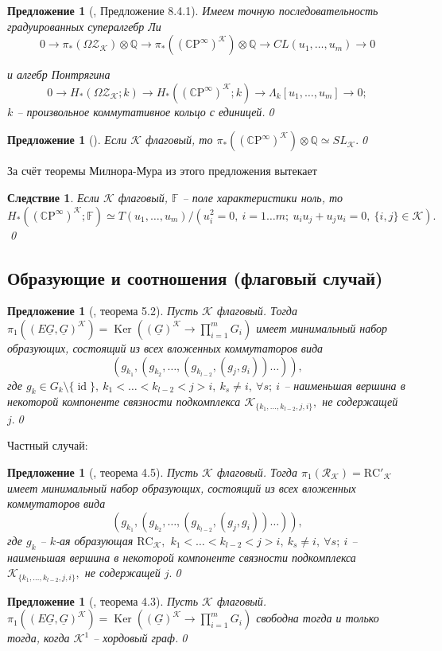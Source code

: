 \documentclass[10pt,a4paper]{article}
\DeclareMathOperator{\id}{id}
\DeclareMathOperator{\Ker}{Ker}
\def\CC{\mathbb{C}}
\def\FF{\mathbb{F}}
\def\QQ{\mathbb{Q}}
\def\RC{\mathrm{RC}}
\def\R{\mathcal{R}}
\def\Z{\mathcal{Z}}
\def\K{\mathcal{K}}
\def\ZK{\Z_\K}
\def\RK{\R_\K}
\def\RCK{\RC_\K}
\def\OZK{\Omega\ZK}
\def\DJ{\CC\mathrm{P}^\infty}
\def\DJK{(\DJ)^\K}
\newtheorem{prp}[thm]{Предложение}
\newtheorem{crl}[thm]{Следствие}
\theoremstyle{definition}
\begin{document}
\begin{prp}[\cite{ToricTopology}, Предложение 8.4.1]
Имеем точную последовательность градуированных супералгебр Ли
$$0\to\pi_*(\OZK)\otimes\QQ\to\pi_*(\DJK)\otimes \QQ\to CL(u_1,\dots,u_m)\to 0$$

и алгебр Понтрягина
$$0\to H_*(\OZK;k)\to H_*(\DJK;k)\to \Lambda_k[u_1,\dots,u_m]\to 0;$$
$k$ -- произвольное коммутативное кольцо с единицей.\qed\end{prp}

\begin{prp}[\cite{pr}] Если $\K$ флаговый, то $\pi_*(\DJK)\otimes\QQ\simeq SL_\K.$\qed
\end{prp}
За счёт теоремы Милнора-Мура из этого предложения вытекает
\begin{crl} Если $\K$ флаговый, $\FF$ -- поле характеристики ноль, то
$$H_*(\DJK;\FF)\simeq T(u_1,\dots, u_m)/\left(u_i^2=0,~i=1\dots m;~u_iu_j+u_ju_i=0,~\{i,j\}\in\K\right).$$\qed
\end{crl}
\subsection{Образующие и соотношения (флаговый случай)}

\begin{prp}[\cite{pv_artin}, теорема 5.2]
Пусть $\K$ флаговый. Тогда $\pi_1((E\underline{G},\underline{G})^\K)=
\Ker((\underline{G})^\K\to\prod_{i=1}^m G_i)$ имеет минимальный набор образующих, состоящий из всех вложенных коммутаторов вида
$$(g_{k_1},(g_{k_2},\dots,(g_{k_{l-2}},(g_j,g_i))\dots)),$$
где $g_k\in G_k\setminus\{\id\},~k_1<\dots<k_{l-2}<j>i,~k_s\neq i,~\forall s;~i$ -- наименьшая вершина в некоторой компоненте связности подкомплекса $\K_{\{k_1,\dots,k_{l-2},j,i\}},$ не содержащей $j.$\qed
\end{prp}
Частный случай:
\begin{prp}[\cite{pv}, теорема 4.5]
Пусть $\K$ флаговый. Тогда $\pi_1(\RK)=\RC'_\K$ имеет минимальный набор образующих, состоящий из всех вложенных коммутаторов вида
$$(g_{k_1},(g_{k_2},\dots,(g_{k_{l-2}},(g_j,g_i))\dots)),$$
где $g_k$ -- $k$-ая образующая $\RCK,$ $k_1<\dots<k_{l-2}<j>i,~k_s\neq i,~\forall s;~i$ -- наименьшая вершина в некоторой компоненте связности подкомплекса $\K_{\{k_1,\dots,k_{l-2},j,i\}},$ не содержащей $j.$\qed
\end{prp}

\begin{prp}[\cite{pv}, теорема 4.3]
Пусть $\K$ флаговый. $\pi_1((E\underline{G},\underline{G})^\K)=
\Ker((\underline{G})^\K\to\prod_{i=1}^m G_i)$ свободна тогда и только тогда, когда $\K^1$ -- хордовый граф.\qed
\end{prp}
\end{document}
